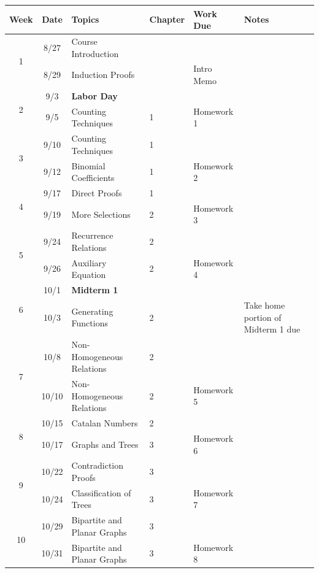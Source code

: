 \documentclass[11pt]{article}
\begin{document}
\begin{landscape}

\begin{tabular}{|c|c|l|l|l|l|} \hline
Week & Date & Topics  & Chapter & Work Due  & Notes \hspace{8cm}  \\ \hline

\multirow{2}{*}{1}
& 8/27  &Course Introduction &&&  \\
& 8/29 &Induction Proofs &&Intro Memo&\\ \hline

\multirow{2}{*}{2}
& 9/3 & {\bf Labor Day}  &&&\\ 
& 9/5  &  Counting Techniques &1& Homework 1& \\ \hline

\multirow{2}{*}{3}
& 9/10 & Counting Techniques  &1&& \\
& 9/12 &  Binomial Coefficients  &1&Homework 2&\\ \hline

\multirow{2}{*}{4}
& 9/17 &  Direct Proofs &1&&\\
& 9/19 & More Selections &2& Homework 3 &\\ \hline

\multirow{2}{*}{5}
& 9/24 &  Recurrence Relations & 2&& \\
& 9/26 &  Auxiliary Equation  & 2 & Homework 4 &\\ \hline

\multirow{2}{*}{6}
& 10/1 &  {\bf Midterm 1}  & &&\\ 
& 10/3 & Generating Functions  & 2 &&Take home portion of Midterm 1 due   \\ \hline

\multirow{2}{*}{7}
& 10/8 & Non-Homogeneous Relations & 2& &\\ 
& 10/10 &  Non-Homogeneous Relations & 2& Homework 5  &\\ \hline

\multirow{2}{*}{8}
& 10/15 &Catalan Numbers  &2 &&\\ 
& 10/17 &  Graphs and Trees&3&Homework 6&\\ \hline

\multirow{2}{*}{9}
& 10/22  & Contradiction Proofs & 3&&\\
& 10/24  & Classification of Trees &3&Homework 7&\\ \hline

\multirow{2}{*}{10}
& 10/29 &Bipartite and Planar Graphs &3&&\\
& 10/31 &Bipartite and Planar Graphs &3&Homework 8&\\ \hline


\end{tabular}
\end{landscape}
\end{document}
